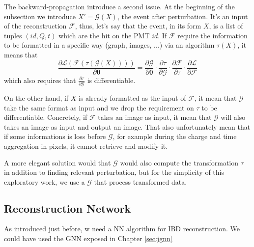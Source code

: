 \documentclass[../main.tex]{subfiles}
\begin{document}
The backward-propagation introduce a second issue. At the beginning of the subsection we introduce $X' = \mathcal{G}(X)$, the event after perturbation. It's an input of the reconstruction $\mathcal{F}$, thus, let's say that the event, in its form $X$, is a list of tuples $(id, Q, t)$ which are the hit on the PMT $id$. If $\mathcal{F}$ require the information to be formatted in a specific way (graph, images, ...) via an algorithm $\tau(X)$, it means that
\begin{equation}
  \frac{\partial \mathcal{L}(\mathcal{F}(\tau(\mathcal{G}(X))))}{\partial \bm{\theta}} = \frac{\partial \mathcal{G}}{\partial \bm{\theta}} \cdot \frac{\partial \tau}{\partial \mathcal{G}} \cdot \frac{\partial \mathcal{F}}{\partial \tau} \cdot \frac{\partial \mathcal{L}}{\partial \mathcal{F}}
\end{equation}
which also requires that $\frac{\partial \tau}{\partial \mathcal{G}}$ is differentiable.

On the other hand, if $X$ is already formatted as the input of $\mathcal{F}$, it mean that $\mathcal{G}$ take the same format as input and we drop the requirement on $\tau$ to be differentiable. Concretely, if $\mathcal{F}$ takes an image as input, it mean that $\mathcal{G}$ will also takes an image as input and output an image. That also unfortunately mean that if some informations is loss before $\mathcal{G}$, for example during the charge and time aggregation in pixels, it cannot retrieve and modify it.

A more elegant solution would that $\mathcal{G}$ would also compute the transformation $\tau$ in addition to finding relevant perturbation, but for the simplicity of this exploratory work, we use a $\mathcal{G}$ that process transformed data.

\subsection{Reconstruction Network}
\label{sec:janne:arch:reco}

As introduced just before, w need a NN algorithm for IBD reconstruction. We could have used the GNN exposed in Chapter \ref{sec:jgnn}
\end{document}
